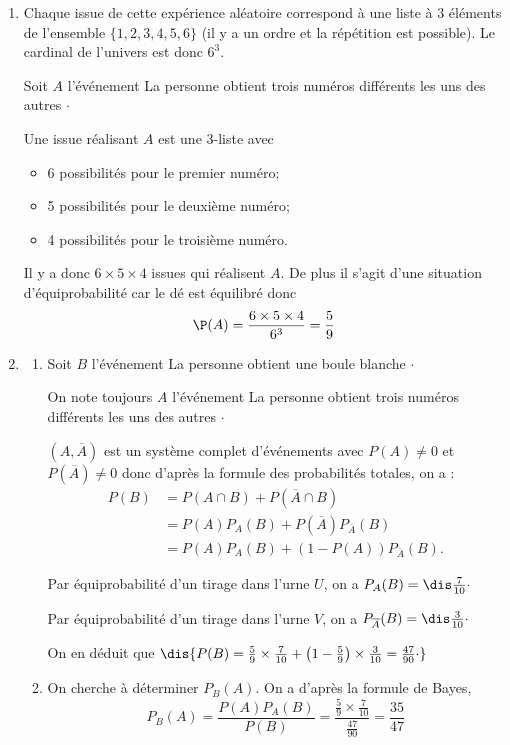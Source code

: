 \documentclass[a4paper,10pt]{report}
\begin{document}
\corr \begin{enumerate}
\item Chaque issue de cette expérience aléatoire correspond à une liste à $3$ éléments de l'ensemble $\{1,2,3,4,5,6\}$ (il y a un ordre et la répétition est possible). Le cardinal de l'univers est donc $6^3$.

\noindent Soit $A$ l'événement \og La personne obtient trois numéros différents les uns des autres \fg $\cdot$

\noindent Une issue réalisant $A$ est une 3-liste avec
\begin{itemize}
 \item 6 possibilités pour le premier numéro;
 \item 5 possibilités pour le deuxième numéro;
 \item 4 possibilités pour le troisième numéro.
\end{itemize}
Il y a donc $6\times 5\times 4$ issues qui réalisent $A$. De plus il s'agit d'une situation d'équiprobabilité car le dé est équilibré donc
$$\P(A) = \frac{6\times 5\times 4}{6^3} = \frac 59$$

\item 
\begin{enumerate}
\item Soit $B$ l'événement \og La personne obtient une boule blanche \fg $\cdot$

\noindent On note toujours $A$ l'événement \og La personne obtient trois numéros différents les uns des autres \fg $\cdot$

\noindent $(A,\overline{A})$ est un système complet d'événements avec $P(A) \neq 0$ et $P(\overline{A}) \neq 0$ donc d'après la formule des probabilités totales, on a :
\begin{align*}
 P(B)&=P(A \cap B)+P(\overline{A} \cap B)\\
 &=P(A)P_{A}(B)+P(\overline{A})P_{\overline{A}}(B)\\
 &=P(A)P_{A}(B)+(1-P(A))P_{\overline{A}}(B).
\end{align*}

\noindent Par équiprobabilité d'un tirage dans l'urne $U$, on a ${P_{A}(B)=\dis \frac 7{10}}\cdot$

\noindent Par équiprobabilité d'un tirage dans l'urne $V$, on a ${P_{\overline{A}}(B)= \dis \frac 3{10}}\cdot$

\noindent On en déduit que $\dis {P(B)=\frac 59 \times \frac 7{10}+\left(1-\frac 59\right) \times \frac 3 {10}=\frac{47}{90}\cdot}$

\item On cherche à déterminer $P_B(A)$. On a d'après la formule de Bayes, 
$$P_B(A)=\frac{P(A)P_A(B)}{P(B)}=\frac{\frac 59 \times \frac 7{10}}{\frac{47}{90}}=\frac{35}{47}$$
\end{enumerate}
\end{enumerate}
\end{document}
